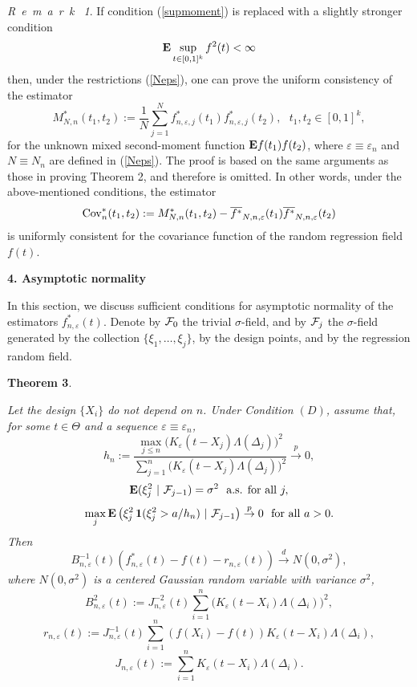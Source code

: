 \documentclass[12pt]{article}
\theoremstyle{remark}
\newtheorem{rem}
{R~e~m~a~r~k~}
\begin{document}
\begin{rem}
If condition (\ref{supmoment}) is replaced with a slightly stronger condition $${\bf E}\sup_{t\in [0,1]^k}f^2(t)<\infty$$ then, under the restrictions (\ref{Neps}), one can prove the uniform consistency of the estimator
$$M_{N,n}^*(t_1,t_2):=\frac{1}{N}\sum\limits_{j=1}^Nf^*_{n,\varepsilon,j}(t_1)f^*_{n,\varepsilon,j}(t_2),\,\,\,\,t_1,t_2\in [0,1]^k,
$$
for the unknown mixed second-moment function ${\bf E}f(t_1)f(t_2)$, where $\varepsilon\equiv \varepsilon_n$ and $N\equiv N_n$ are defined in (\ref{Neps}). The proof is based on the same arguments as those in proving Theorem 2, and therefore is omitted.
In other words, under the above-mentioned conditions, the estimator $${\rm Cov}^*_n(t_1,t_2):= M_{N,n}^*(t_1,t_2)-\overline{f^*}_{N,n,\varepsilon}(t_1)\overline{f^*}_{N,n,\varepsilon}(t_2)$$ is uniformly consistent for the covariance function of the random regression field $f(t)$.
\end{rem}


\newpage
\begin{center}
{\bf 4. Asymptotic normality}
\end{center}
 In this section, we discuss sufficient conditions for  asymptotic normality of the estimators $f^*_{n,\varepsilon}(t)$.
Denote by ${\cal F}_0$ the trivial $\sigma$-field, and by ${\cal F}_j$  the $\sigma$-field generated by the collection $\{\xi_1,\ldots,\xi_j\}$, by the design points, and by the regression random field. 

{\bf Theorem 3}. {\it
Let the design $\{X_i\}$ do not  depend on $n$.  
Under Condition $(D)$, assume that, for some $t\in \Theta$ and a sequence $\varepsilon\equiv \varepsilon_n$,
\begin{equation}\label{AN1}
h_n:=\frac{\max_{j\le n} \big(K_{\varepsilon}\left(t-X_j\right)
\Lambda(\Delta_j)\big)^2}{\sum_{j=1}^n \big(K_{\varepsilon}\left(t-X_j\right)
\Lambda(\Delta_j)\big)^2}\stackrel{p}\to 0,
\end{equation}
$${\bf E}(\xi_j^2\  |\ {\cal F}_{j-1})=\sigma^2\ \mbox{ a.s. for all }j,
$$
$$ \max_j {\bf E}\left(\xi_j^2\, {\bf 1} (\xi_j^2>a/h_n)\  |\  {\cal F}_{j-1}\right)
\stackrel{p}{\to} 0\ \mbox{ for all }a>0.
$$
Then
\begin{equation*}%
B^{-1}_{n,\varepsilon}(t)\left(f^*_{n,\varepsilon}(t)-f(t) -r_{n,\varepsilon}(t)\right)\stackrel{d}\to N(0,\sigma^2),
\end{equation*}
where $N(0,\sigma^2)$ is a centered Gaussian random variable with variance $\sigma^2$,
$$B^2_{n,\varepsilon}(t):=J^{-2}_{n,\varepsilon}(t)
\sum\limits_{i=1}^n\big(K_{\varepsilon}(t-X_{i})\Lambda(\Delta_i)\big)^2,
$$
$$r_{n,\varepsilon}(t):=J^{-1}_{n,\varepsilon}(t)
\sum\limits_{i=1}^n(f(X_{i})-f(t))K_{\varepsilon}\left(t-X_{i}\right)\Lambda(\Delta_i),
$$
$$J_{n,\varepsilon}(t):=\sum\limits_{i=1}^nK_{\varepsilon}(t-X_{i})\Lambda(\Delta_i).
$$

}
\end{document}
